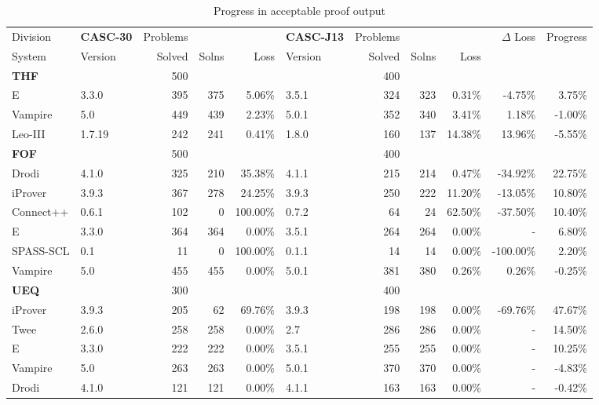 \documentclass[aic]{iosart2x}
\newcommand{\bb}[1]{\bf {#1}}
\newcommand{\LAST}{\mbox{CASC-30}}
\newcommand{\THIS}{\mbox{CASC-J13}}
\begin{document}
\begin{table}[htb]
\caption{Progress in acceptable proof output}
\label{ProofProgress}
\begin{tabular}{l|lrrr|lrrr|rr}
\hline
Division    & \bb{\LAST{}}&Problems&    &         & \bb{\THIS{}}&Problems&   &        & $\Delta$ Loss &Progress \\
System      & Version  & Solved & Solns &  Loss   & Version & Solved & Solns &  Loss  &               &         \\
\hline
\bb{THF}    &          &   500 &        &         &         &   400 &        &        &               &          \\
E           & 3.3.0    &   395 &    375 &  5.06\% & 3.5.1   &   324 &    323 &  0.31\% &       -4.75\% &   3.75\% \\
Vampire     & 5.0      &   449 &    439 &  2.23\% & 5.0.1   &   352 &    340 &  3.41\% &        1.18\% &  -1.00\% \\
Leo-III     & 1.7.19   &   242 &    241 &  0.41\% & 1.8.0   &   160 &    137 & 14.38\% &       13.96\% &  -5.55\% \\
\hline
\bb{FOF}    &          &   500 &        &         &         &   400 &        &        &               &          \\
Drodi       & 4.1.0    &   325 &    210 & 35.38\% & 4.1.1   &   215 &    214 &  0.47\% &      -34.92\% &  22.75\% \\
iProver     & 3.9.3    &   367 &    278 & 24.25\% & 3.9.3   &   250 &    222 & 11.20\% &      -13.05\% &  10.80\% \\
Connect++   & 0.6.1    &   102 &      0 &100.00\% & 0.7.2   &    64 &     24 & 62.50\% &      -37.50\% &  10.40\% \\
E           & 3.3.0    &   364 &    364 &  0.00\% & 3.5.1   &   264 &    264 &  0.00\% &             - &   6.80\% \\
SPASS-SCL   & 0.1      &    11 &      0 &100.00\% & 0.1.1   &    14 &     14 &  0.00\% &     -100.00\% &   2.20\% \\
Vampire     & 5.0      &   455 &    455 &  0.00\% & 5.0.1   &   381 &    380 &  0.26\% &        0.26\% &  -0.25\% \\
\hline
\bb{UEQ}    &          &   300 &        &         &         &   400 &        &        &               &          \\
iProver     & 3.9.3    &   205 &     62 & 69.76\% & 3.9.3   &   198 &    198 &  0.00\% &      -69.76\% &  47.67\% \\
Twee        & 2.6.0    &   258 &    258 &  0.00\% & 2.7     &   286 &    286 &  0.00\% &             - &  14.50\% \\
E           & 3.3.0    &   222 &    222 &  0.00\% & 3.5.1   &   255 &    255 &  0.00\% &             - &  10.25\% \\
Vampire     & 5.0      &   263 &    263 &  0.00\% & 5.0.1   &   370 &    370 &  0.00\% &             - &  -4.83\% \\
Drodi       & 4.1.0    &   121 &    121 &  0.00\% & 4.1.1   &   163 &    163 &  0.00\% &             - &  -0.42\% \\
\hline
\end{tabular}
\end{table}
\end{document}
